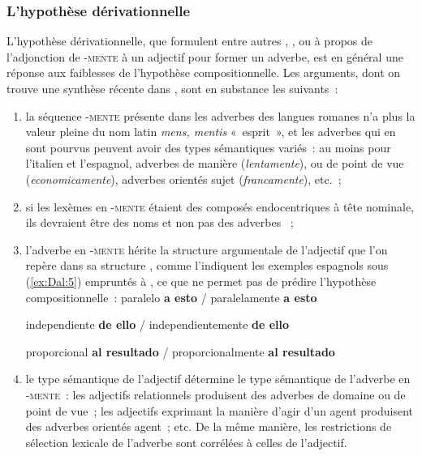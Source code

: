 \documentclass[output=paper]{langsci/langscibook}
\begin{document}
\subsubsection{L'hypothèse dérivationnelle}\label{section:dal:2.1.2}

L'hypothèse dérivationnelle, que formulent entre autres %
\citet{Karlsson81}%
%
, %
\citet{Bosque89}%
%
, %
\citet{Varela90} %
%
ou %
\citet{Rainer96,Rainer16b} %
%
à propos de l'adjonction de -\textsc{mente} à un adjectif pour former un adverbe, est en général une réponse aux faiblesses de l'hypothèse compositionnelle. Les arguments, dont on trouve une synthèse récente dans %
\citealt{Torner2016}%
%
, sont en substance les suivants~:
\begin{enumerate}[label=(\roman*)]
\item la séquence -\textsc{mente} présente dans les adverbes des langues romanes n'a plus la valeur pleine du nom latin \emph{mens, mentis} «~esprit~», et les adverbes qui en sont pourvus peuvent avoir des types sémantiques variés~: au moins pour l'italien et l'espagnol, adverbes de manière (\emph{lentamente}), ou de point de vue (\emph{economicamente}), adverbes orientés sujet (\emph{francamente}), etc.~;

\item si les lexèmes en -\textsc{mente} étaient des composés endocentriques à tête nominale, ils devraient être des noms et non pas des adverbes %
\citep[cf. aussi ][]{Fabregas07}%
%
~;

\item l'adverbe en -\textsc{mente} hérite la structure argumentale de l'adjectif que l'on repère dans sa structure %
\citep{Bosque89,Cifuentes02}%
%
, comme l'indiquent les exemples espagnols sous (\ref{ex:Dal:5}) empruntés à %
\citet{Fabregas07}%
%
, ce que ne permet pas de prédire l'hypothèse compositionnelle~:
\ea\label{ex:Dal:5}
       \ea paralelo \textbf{a esto} / paralelamente \textbf{a esto}

        \ex independiente \textbf{de ello} / independientemente \textbf{de ello}

        \ex proporcional \textbf{al resultado} / proporcionalmente \textbf{al resultado}
\z\z

\item le type sémantique de l'adjectif détermine le type sémantique de l'adverbe en \mbox{-\textsc{mente}}~: les adjectifs relationnels produisent des adverbes de domaine ou de point de vue~; les adjectifs exprimant la manière d'agir d'un agent produisent des adverbes orientés agent~; etc.
De la même manière, les restrictions de sélection lexicale de l'adverbe sont corrélées à celles de l'adjectif.

\end{enumerate}
\end{document}
